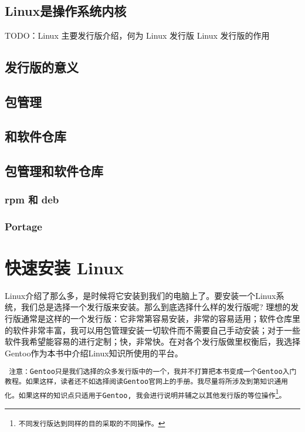 \documentclass[amstex,twoside]{ctexbook}
\newenvironment{notice}{\tt}{}
\begin{document}

\section{Linux是操作系统内核}

TODO：Linux 主要发行版介绍，何为 Linux 发行版 Linux 发行版的作用

\section{发行版的意义}
\section{包管理}
\section{和软件仓库}


\section{包管理和软件仓库}

\subsection*{rpm 和 deb}
\subsection*{Portage}


\chapter{快速安装 Linux}
Linux介绍了那么多，是时候将它安装到我们的电脑上了。要安装一个Linux系统，我们总是选择一个发行版来安装。那么到底选择什么样的发行版呢? 理想的发行版通常是这样的一个发行版：它非常第容易安装，非常的容易适用；软件仓库里的软件非常丰富，我可以用包管理安装一切软件而不需要自己手动安装；对于一些软件我希望能容易的进行定制；快，非常快。在对各个发行版做里权衡后，我选择Gentoo作为本书中介绍Linux知识所使用的平台。


\begin{notice}
 注意：Gentoo只是我们选择的众多发行版中的一个，我并不打算把本书变成一个Gentoo入门教程。如果这样，读者还不如选择阅读Gentoo官网上的手册。我尽量将所涉及到第知识通用化。如果这样的知识点只适用于Gentoo, 我会进行说明并辅之以其他发行版的等位操作\footnote{不同发行版达到同样的目的采取的不同操作。}。
\end{notice}
\end{document}

